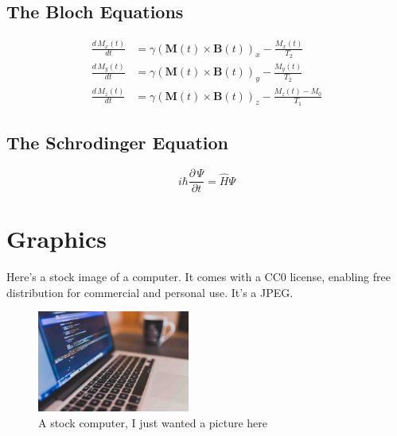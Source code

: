 \documentclass{workreport}
\begin{document}
\begin{body}
	\lipsum[1]

\subsection{The Bloch Equations}

	\begin{align}
		\frac{d\, M_x(t)}{dt} &= \gamma(\mathbf{M}(t) \times \mathbf{B}(t))_x - \frac{M_x(t)}{T_2} \\
		\frac{d\, M_y(t)}{dt} &= \gamma(\mathbf{M}(t) \times \mathbf{B}(t))_y - \frac{M_y(t)}{T_2} \\
		\frac{d\, M_z(t)}{dt} &= \gamma(\mathbf{M}(t) \times \mathbf{B}(t))_z - \frac{M_z(t) - M_0}{T_1}
	\end{align}

\subsection{The Schrodinger Equation}

	\begin{equation}
		i\hbar \frac{\partial \, \Psi}{\partial t} = \hat{H}\Psi
	\end{equation}

\section{Graphics}

	Here's a stock image of a computer. It comes with a CC0 license, enabling
	free distribution for commercial and personal use. It's a JPEG.
	
	\begin{figure}[!ht]
		\centering
		\label{fig:stock_computer}
		\includegraphics[width=5cm]{./stock-image.jpg}
		\caption{A stock computer, I just wanted a picture here}
	\end{figure}


\end{body}
\end{document}
